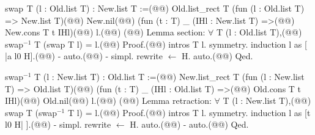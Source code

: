swap$\phantom{^{2}}$T (l : Old.list T) : New.list T :=(@\vspace{-0.04cm}@)
  Old.list_rect T (fun (l : Old.list T) => New.list T)(@\vspace{-0.04cm}@)
    New.nil(@\vspace{-0.04cm}@)
    (fun (t : T) _ (IHl : New.list T) =>(@\vspace{-0.04cm}@)
      New.cons T t IHl)(@\vspace{-0.04cm}@)
    l.(@\vspace{-0.04cm}@)
(@\vspace{-0.04cm}@)
Lemma section: $\forall$ T (l : Old.list T),(@\vspace{-0.04cm}@)
  swap$^{-1}$ T (swap T l) = l.(@\vspace{-0.04cm}@)
Proof.(@\vspace{-0.04cm}@)
  intros T l. symmetry. induction l as [ |a l0 H].(@\vspace{-0.04cm}@)
  - auto.(@\vspace{-0.04cm}@)
  - simpl. rewrite $\leftarrow$ H. auto.(@\vspace{-0.04cm}@)
Qed.

swap$^{-1}$ T (l : New.list T) : Old.list T :=(@\vspace{-0.04cm}@)
  New.list_rect T (fun (l : New.list T) => Old.list T)(@\vspace{-0.04cm}@)
    (fun (t : T) _ (IHl : Old.list T) =>(@\vspace{-0.04cm}@)
      Old.cons T t IHl)(@\vspace{-0.04cm}@)
    Old.nil(@\vspace{-0.04cm}@)
    l.(@\vspace{-0.04cm}@)
(@\vspace{-0.04cm}@)
Lemma retraction: $\forall$ T (l : New.list T),(@\vspace{-0.04cm}@)
  swap T (swap$^{-1}$ T l) = l.(@\vspace{-0.04cm}@)
Proof.(@\vspace{-0.04cm}@)
  intros T l. symmetry. induction l as [t l0 H| ].(@\vspace{-0.04cm}@)
  - simpl. rewrite $\leftarrow$ H. auto.(@\vspace{-0.04cm}@)
  - auto.(@\vspace{-0.04cm}@)
Qed.
